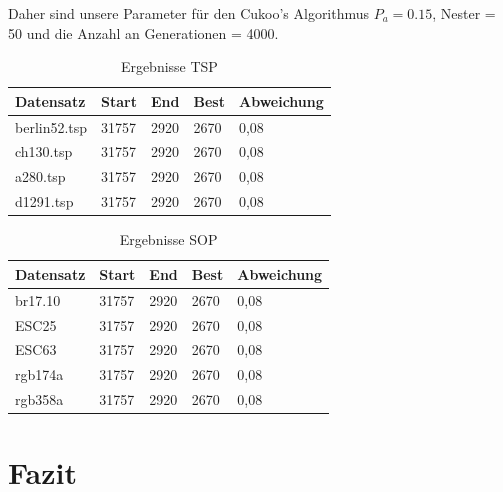 \documentclass[conference]{IEEEtran}
\begin{document}
      Daher sind unsere Parameter für den Cukoo's Algorithmus $P_a = 0.15$, Nester = 50 und die Anzahl an Generationen = 4000. 


    \begin{table}[h]
      \label{TSP}
      \centering
      \begin{tabular}{|l|ll|l|l|}
      \hline
          Datensatz & \multicolumn{1}{l|}{Start} & End  & Best & Abweichung \\ \hline
          berlin52.tsp  & \multicolumn{1}{l|}{31757} & 2920 & 2670 & 0,08       \\ \hline
          ch130.tsp  & \multicolumn{1}{l|}{31757} & 2920 & 2670 & 0,08       \\ \hline
          a280.tsp  & \multicolumn{1}{l|}{31757} & 2920 & 2670 & 0,08       \\ \hline
          d1291.tsp  & \multicolumn{1}{l|}{31757} & 2920 & 2670 & 0,08       \\ \hline
      \end{tabular}
      \caption[]{Ergebnisse TSP}
    \end{table}



    \begin{table}[h]
      \label{SOP}
      \centering
      \begin{tabular}{|l|ll|l|l|}
      \hline
          Datensatz & \multicolumn{1}{l|}{Start} & End  & Best & Abweichung \\ \hline
          br17.10  & \multicolumn{1}{l|}{31757} & 2920 & 2670 & 0,08       \\ \hline
          ESC25  & \multicolumn{1}{l|}{31757} & 2920 & 2670 & 0,08       \\ \hline
          ESC63  & \multicolumn{1}{l|}{31757} & 2920 & 2670 & 0,08       \\ \hline
          rgb174a  & \multicolumn{1}{l|}{31757} & 2920 & 2670 & 0,08       \\ \hline
          rgb358a  & \multicolumn{1}{l|}{31757} & 2920 & 2670 & 0,08       \\ \hline
      \end{tabular}
      \caption[]{Ergebnisse SOP}
    \end{table}

  \section{Fazit}
\end{document}
